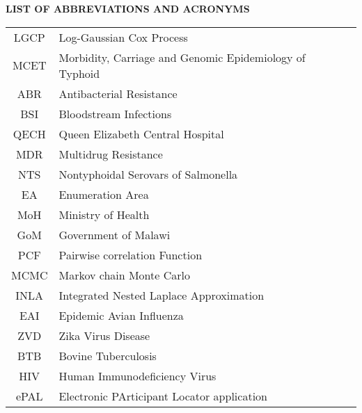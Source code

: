 \documentclass[a4paper]{thesis}
\begin{document}
\renewcommand\contentsname{TABLE OF CONTENTS}

\begin{large}
\begin{center}
\tableofcontents
\end{center}
\end{large}

\begin{large}
\begin{center}
\listoffigures
\end{center}
\end{large}

\begin{large}
\begin{center}
\listoftables
\end{center}
\end{large}

\newpage




\begin{large}
\begin{center}
\bf{LIST OF ABBREVIATIONS AND ACRONYMS}
\end{center}
\end{large}

\begin{table}[H]
\begin{tabular}{c l c}
LGCP &  Log-Gaussian Cox Process\\
MCET & Morbidity, Carriage and Genomic Epidemiology of Typhoid\\
ABR & Antibacterial Resistance\\
BSI &  Bloodstream Infections\\
QECH & Queen Elizabeth Central Hospital\\
MDR & Multidrug Resistance\\
NTS & Nontyphoidal Serovars of Salmonella\\
EA & Enumeration Area\\
MoH & Ministry of Health\\
GoM & Government of Malawi\\
PCF & Pairwise correlation Function\\
MCMC & Markov chain Monte Carlo\\
INLA & Integrated Nested Laplace Approximation\\
EAI & Epidemic Avian Influenza\\
ZVD & Zika Virus Disease\\
BTB & Bovine Tuberculosis\\
HIV & Human Immunodeficiency Virus\\
ePAL & Electronic PArticipant Locator application
\end{tabular}
\end{table}
\end{document}
